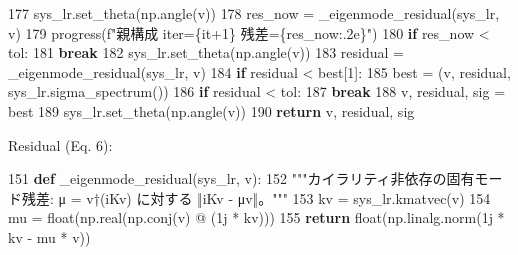 \documentclass[
  a4paper,
]{ltjsarticle}
\newenvironment{Shaded}{}{}
\newcommand{\BuiltInTok}[1]{\textcolor[rgb]{0.00,0.50,0.00}{#1}}
\newcommand{\ControlFlowTok}[1]{\textcolor[rgb]{0.00,0.44,0.13}{\textbf{#1}}}
\newcommand{\DecValTok}[1]{\textcolor[rgb]{0.25,0.63,0.44}{#1}}
\newcommand{\KeywordTok}[1]{\textcolor[rgb]{0.00,0.44,0.13}{\textbf{#1}}}
\newcommand{\NormalTok}[1]{#1}
\newcommand{\OperatorTok}[1]{\textcolor[rgb]{0.40,0.40,0.40}{#1}}
\newcommand{\OtherTok}[1]{\textcolor[rgb]{0.00,0.44,0.13}{#1}}
\newcommand{\SpecialCharTok}[1]{\textcolor[rgb]{0.25,0.44,0.63}{#1}}
\newcommand{\SpecialStringTok}[1]{\textcolor[rgb]{0.73,0.40,0.53}{#1}}
\newcommand{\StringTok}[1]{\textcolor[rgb]{0.25,0.44,0.63}{#1}}
\begin{document}
\begin{Shaded}
\begin{Highlighting}[]
   \DecValTok{177}\NormalTok{                  sys\_lr.set\_theta(np.angle(v))}
   \DecValTok{178}\NormalTok{                  res\_now }\OperatorTok{=}\NormalTok{ \_eigenmode\_residual(sys\_lr, v)}
   \DecValTok{179}\NormalTok{                  progress(}\SpecialStringTok{f"親構成 iter=}\SpecialCharTok{\{}\NormalTok{it}\OperatorTok{+}\DecValTok{1}\SpecialCharTok{\}}\SpecialStringTok{ 残差=}\SpecialCharTok{\{}\NormalTok{res\_now}\SpecialCharTok{:.2e\}}\SpecialStringTok{"}\NormalTok{)}
   \DecValTok{180}                  \ControlFlowTok{if}\NormalTok{ res\_now }\OperatorTok{\textless{}}\NormalTok{ tol:}
   \DecValTok{181}                      \ControlFlowTok{break}
   \DecValTok{182}\NormalTok{          sys\_lr.set\_theta(np.angle(v))}
   \DecValTok{183}\NormalTok{          residual }\OperatorTok{=}\NormalTok{ \_eigenmode\_residual(sys\_lr, v)}
   \DecValTok{184}          \ControlFlowTok{if}\NormalTok{ residual }\OperatorTok{\textless{}}\NormalTok{ best[}\DecValTok{1}\NormalTok{]:}
   \DecValTok{185}\NormalTok{              best }\OperatorTok{=}\NormalTok{ (v, residual, sys\_lr.sigma\_spectrum())}
   \DecValTok{186}          \ControlFlowTok{if}\NormalTok{ residual }\OperatorTok{\textless{}}\NormalTok{ tol:}
   \DecValTok{187}              \ControlFlowTok{break}
   \DecValTok{188}\NormalTok{      v, residual, sig }\OperatorTok{=}\NormalTok{ best}
   \DecValTok{189}\NormalTok{      sys\_lr.set\_theta(np.angle(v))}
   \DecValTok{190}      \ControlFlowTok{return}\NormalTok{ v, residual, sig}
\end{Highlighting}
\end{Shaded}

Residual (Eq. 6):

\begin{Shaded}
\begin{Highlighting}[]
   \DecValTok{151}  \KeywordTok{def}\NormalTok{ \_eigenmode\_residual(sys\_lr, v):}
   \DecValTok{152}      \StringTok{"""カイラリティ非依存の固有モード残差: μ = v†(iKv) に対する ‖iKv {-} μv‖。"""}
   \DecValTok{153}\NormalTok{      kv }\OperatorTok{=}\NormalTok{ sys\_lr.kmatvec(v)}
   \DecValTok{154}\NormalTok{      mu }\OperatorTok{=} \BuiltInTok{float}\NormalTok{(np.real(np.conj(v) }\OperatorTok{@}\NormalTok{ (}\OtherTok{1j} \OperatorTok{*}\NormalTok{ kv)))}
   \DecValTok{155}      \ControlFlowTok{return} \BuiltInTok{float}\NormalTok{(np.linalg.norm(}\OtherTok{1j} \OperatorTok{*}\NormalTok{ kv }\OperatorTok{{-}}\NormalTok{ mu }\OperatorTok{*}\NormalTok{ v))}
\end{Highlighting}
\end{Shaded}
\end{document}
